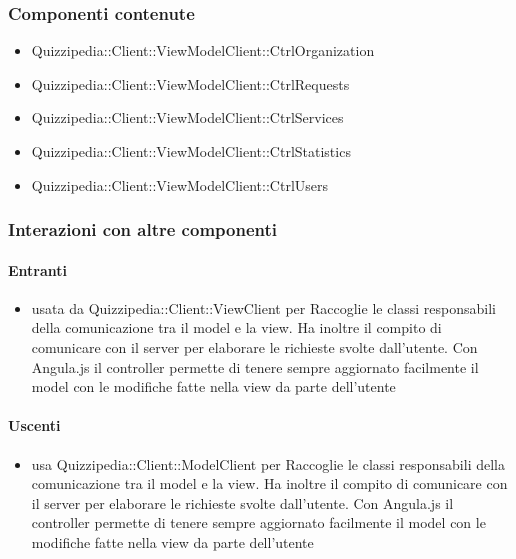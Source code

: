 \subsubsection{Componenti contenute}
\begin{itemize}
\item Quizzipedia::Client::ViewModelClient::CtrlOrganization
\item Quizzipedia::Client::ViewModelClient::CtrlRequests
\item Quizzipedia::Client::ViewModelClient::CtrlServices
\item Quizzipedia::Client::ViewModelClient::CtrlStatistics
\item Quizzipedia::Client::ViewModelClient::CtrlUsers
\end{itemize}
\subsubsection{Interazioni con altre componenti}
\paragraph{Entranti}
\begin{itemize}
\item usata da Quizzipedia::Client::ViewClient per Raccoglie le classi responsabili della comunicazione tra il model e la view. Ha inoltre il compito di comunicare con il server per elaborare le richieste svolte dall'utente.
Con Angula.js il controller permette di tenere sempre aggiornato facilmente il model con le modifiche fatte nella view da parte dell'utente
\end{itemize}
\paragraph{Uscenti}
\begin{itemize}
\item usa Quizzipedia::Client::ModelClient per Raccoglie le classi responsabili della comunicazione tra il model e la view. Ha inoltre il compito di comunicare con il server per elaborare le richieste svolte dall'utente.
Con Angula.js il controller permette di tenere sempre aggiornato facilmente il model con le modifiche fatte nella view da parte dell'utente
\end{itemize}
